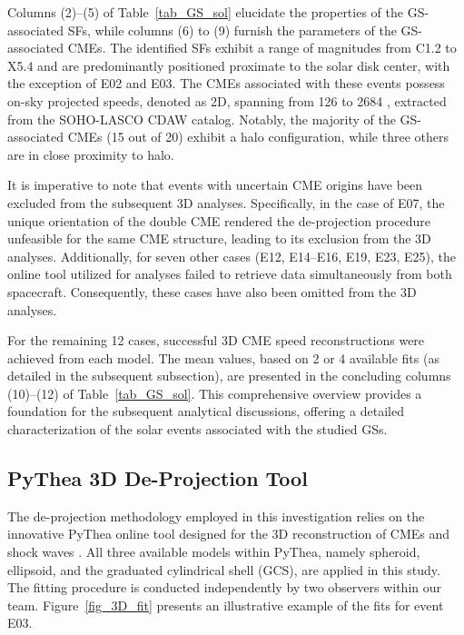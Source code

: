 Columns (2)–(5) of Table~\ref{tab_GS_sol} elucidate the properties of the GS-associated SFs, while columns (6) to (9) furnish the parameters of the GS-associated CMEs. The identified SFs exhibit a range of magnitudes from C1.2 to X5.4 and are predominantly positioned proximate to the solar disk center, with the exception of E02 and E03. The CMEs associated with these events possess on-sky projected speeds, denoted as 2D, spanning from 126 to 2684 \kms, extracted from the SOHO-LASCO CDAW catalog. Notably, the majority of the GS-associated CMEs (15 out of 20) exhibit a halo configuration, while three others are in close proximity to halo.

It is imperative to note that events with uncertain CME origins have been excluded from the subsequent 3D analyses. Specifically, in the case of E07, the unique orientation of the double CME rendered the de-projection procedure unfeasible for the same CME structure, leading to its exclusion from the 3D analyses. Additionally, for seven other cases (E12, E14–E16, E19, E23, E25), the online tool utilized for analyses failed to retrieve data simultaneously from both spacecraft. Consequently, these cases have also been omitted from the 3D analyses.

For the remaining 12 cases, successful 3D CME speed reconstructions were achieved from each model. The mean values, based on 2 or 4 available fits (as detailed in the subsequent subsection), are presented in the concluding columns (10)–(12) of Table~\ref{tab_GS_sol}. This comprehensive overview provides a foundation for the subsequent analytical discussions, offering a detailed characterization of the solar events associated with the studied GSs.

\subsection{PyThea 3D De-Projection Tool}
The de-projection methodology employed in this investigation relies on the innovative PyThea online tool designed for the 3D reconstruction of CMEs and shock waves \citep{kouloumvakos_2022}. All three available models within PyThea, namely spheroid, ellipsoid, and the graduated cylindrical shell (GCS), are applied in this study. The fitting procedure is conducted independently by two observers within our team. Figure~\ref{fig_3D_fit} presents an illustrative example of the fits for event E03.

